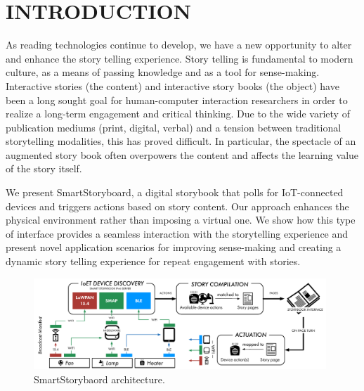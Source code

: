 \documentclass{sigchi}
\newcommand\name{SmartStoryboard}
\newcommand\namesp{SmartStorybaord }
\begin{document}




\newpage
\section{INTRODUCTION}
As reading technologies continue to develop, we have a new opportunity to alter and enhance the story telling experience. Story telling is fundamental to modern culture, as a means of passing knowledge and as a tool for sense-making. Interactive stories (the content) and interactive story books (the object) have been a long sought goal for human-computer interaction researchers in order to realize a long-term engagement and critical thinking. Due to the wide variety of publication mediums (print, digital, verbal) and a tension between traditional storytelling modalities, this has proved difficult. In particular, the spectacle of an augmented story book often overpowers the content and affects the learning value of the story itself. 

We present \name, a digital storybook that polls for IoT-connected devices and triggers actions based on story content. Our approach enhances the physical environment rather than imposing a virtual one. We show how this type of interface provides a seamless interaction with the storytelling experience and present novel application scenarios for improving sense-making and creating a dynamic story telling experience for repeat engagement with stories. 
   


  \begin{figure}[th!]
      \centering
      \includegraphics[keepaspectratio, width=0.98\textwidth]{figures/architecture.pdf} 
      \caption{\namesp architecture. }
      \vspace{-4pt}
      \label{fig:architecture} 
    \end{figure}
\end{document}
